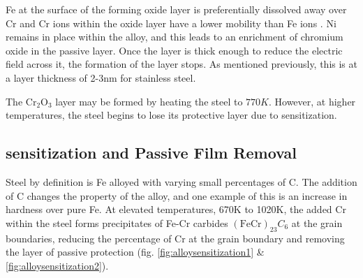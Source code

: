 Fe at the surface of the forming oxide layer is preferentially dissolved away over Cr \cite{kirchheimcc} and Cr ions within the oxide layer have a lower mobility than Fe ions \cite{kirchheimpassive}.  Ni remains in place within the alloy, and this leads to an enrichment of chromium oxide in the passive layer.  Once the layer is thick enough to reduce the electric field across it, the formation of the layer stops.  As mentioned previously, this is at a layer thickness of 2-3nm for stainless steel.

The $\text{Cr}_{2}\text{O}_{3}$ layer may be formed by heating the steel to $770K$\cite{propaustenitic}.  However, at higher temperatures, the steel begins to lose its protective layer due to \gls{sensitization}.


\subsection{\Gls{sensitization} and Passive Film Removal}

Steel by definition is Fe alloyed with varying small percentages of \Gls{C}.  The addition of \Gls{C} changes the property of the alloy, and one example of this is an increase in hardness over pure Fe.  At elevated temperatures, 670K to 1020K, the added Cr within the steel forms precipitates of Fe-Cr carbides $(\text{Fe}\text{Cr})_{23} C_{6}$ at the grain boundaries, reducing the percentage of Cr at the grain boundary and removing the layer of passive protection (fig. \ref{fig:alloysensitization1} \& \ref{fig:alloysensitization2}).

